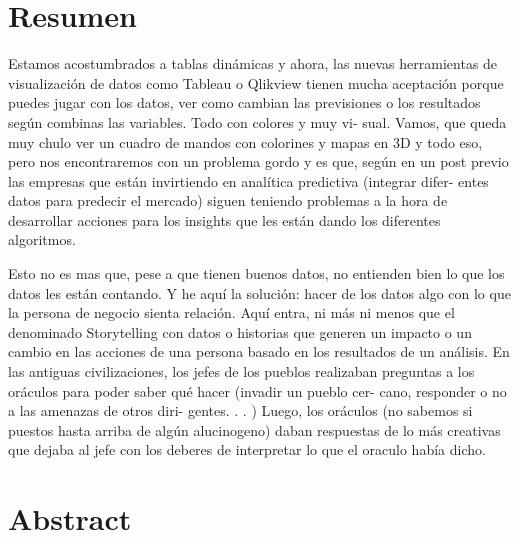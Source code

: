\documentclass[twoside,twocolumn]{article}
\begin{document}
\section{Resumen}
Estamos acostumbrados   a   tablas   dinámicas   y ahora,   
las   nuevas herramientas de visualización de datos como 
Tableau o Qlikview tienen mucha aceptación  porque  puedes  jugar  con  los  
datos,  ver como cambian las previsiones o los resultados según combinas 
las variables. Todo con colores y muy vi- sual. Vamos, que queda muy chulo 
ver un cuadro de mandos con colorines y mapas en 3D y todo eso, pero nos 
encontraremos con un problema gordo y es que, según en un 
post previo las empresas que están invirtiendo en analítica predictiva 
(integrar difer- entes datos para predecir el mercado) siguen teniendo 
problemas a la hora de desarrollar acciones para los insights que les están 
dando los diferentes algoritmos.
 
Esto  no  es  mas  que,  pese  a  que  tienen  
buenos datos,  no  entienden  bien  lo  que  los  datos les  están  
contando.   Y  he  aquí  la  solución:   
hacer de los datos algo con lo que la persona de negocio sienta relación.  
Aquí entra, ni más ni menos que el denominado Storytelling con datos o 
historias que generen un impacto o un cambio en las acciones de una 
persona basado en los resultados de un análisis. En las antiguas 
civilizaciones, los jefes de los pueblos  realizaban  preguntas  a  los  
oráculos  para poder   saber   qué  hacer   
(invadir   un   pueblo   cer- cano, responder o no a 
las amenazas de otros diri- gentes. . . )	Luego,   los   oráculos   
(no   sabemos   si puestos  hasta  arriba  de  algún  alucinogeno)  
daban respuestas de lo más 
creativas que dejaba al jefe con los deberes de interpretar lo que el oraculo había 
dicho.



\section{Abstract}
\end{document}
